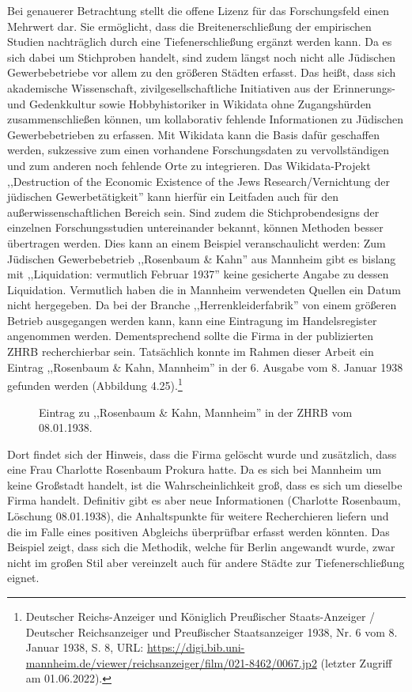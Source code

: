 Bei genauerer Betrachtung stellt die offene Lizenz für das Forschungsfeld einen Mehrwert dar. Sie ermöglicht, dass die Breitenerschließung der empirischen Studien nachträglich durch eine Tiefenerschließung ergänzt werden kann. Da es sich dabei um Stichproben handelt, sind zudem längst noch nicht alle Jüdischen Gewerbebetriebe vor allem zu den größeren Städten erfasst. Das heißt, dass sich akademische Wissenschaft, zivilgesellschaftliche Initiativen aus der Erinnerungs- und Gedenkkultur sowie Hobbyhistoriker in Wikidata ohne Zugangshürden zusammenschließen können, um kollaborativ fehlende Informationen zu Jüdischen Gewerbebetrieben zu erfassen. Mit Wikidata kann die Basis dafür geschaffen werden, sukzessive zum einen vorhandene Forschungsdaten zu vervollständigen und zum anderen noch fehlende Orte zu integrieren. Das Wikidata-Projekt ,,Destruction of the Economic Existence of the Jews Research/Vernichtung der jüdischen Gewerbetätigkeit'' kann hierfür ein Leitfaden auch für den außerwissenschaftlichen Bereich sein. Sind zudem die Stichprobendesigns der einzelnen Forschungsstudien untereinander bekannt, können Methoden besser übertragen werden. Dies kann an einem Beispiel veranschaulicht werden: Zum Jüdischen Gewerbebetrieb ,,Rosenbaum \& Kahn'' aus Mannheim gibt es bislang mit ,,Liquidation: vermutlich Februar 1937'' keine gesicherte Angabe zu dessen Liquidation. Vermutlich haben die in Mannheim verwendeten Quellen ein Datum nicht hergegeben. Da bei der Branche ,,Herrenkleiderfabrik'' von einem größeren Betrieb ausgegangen werden kann, kann eine Eintragung im Handelsregister angenommen werden. Dementsprechend sollte die Firma in der publizierten ZHRB recherchierbar sein. Tatsächlich konnte im Rahmen dieser Arbeit ein Eintrag ,,Rosenbaum \& Kahn, Mannheim'' in der 6. Ausgabe vom 8. Januar 1938 gefunden werden (Abbildung 4.25).\footnote{Deutscher Reichs-Anzeiger und Königlich Preußischer Staats-Anzeiger / Deutscher Reichsanzeiger und Preußischer Staatsanzeiger 1938, Nr. 6 vom 8. Januar 1938, S. 8, URL: \url{https://digi.bib.uni-mannheim.de/viewer/reichsanzeiger/film/021-8462/0067.jp2} (letzter Zugriff am 01.06.2022).}

\begin{figure}[h]
    \centering
    \caption{Eintrag zu ,,Rosenbaum \& Kahn, Mannheim'' in der ZHRB vom 08.01.1938.}
    \label{fig:x cubed graph}
\end{figure}

Dort findet sich der Hinweis, dass die Firma gelöscht wurde und zusätzlich, dass eine Frau Charlotte Rosenbaum Prokura hatte. Da es sich bei Mannheim um keine Großstadt handelt, ist die Wahrscheinlichkeit groß, dass es sich um dieselbe Firma handelt. Definitiv gibt es aber neue Informationen (Charlotte Rosenbaum, Löschung 08.01.1938), die Anhaltspunkte für weitere Recherchieren liefern und die im Falle eines positiven Abgleichs überprüfbar erfasst werden könnten. Das Beispiel zeigt, dass sich die Methodik, welche für Berlin angewandt wurde, zwar nicht im großen Stil aber vereinzelt auch für andere Städte zur Tiefenerschließung eignet. 

